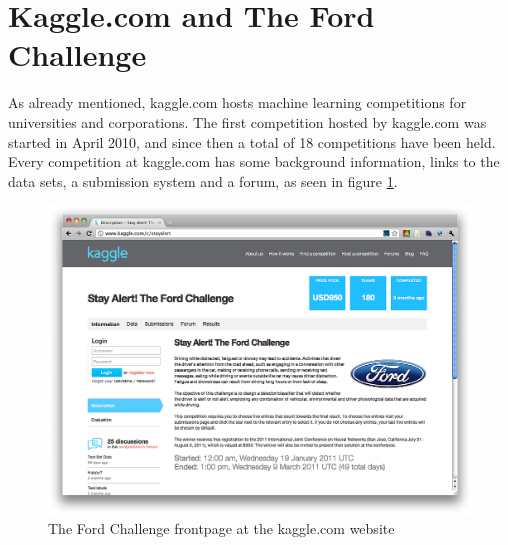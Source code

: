 \section{Kaggle.com and The Ford Challenge}
As already mentioned, kaggle.com hosts machine learning competitions for universities and corporations. The first competition hosted by kaggle.com was started in April 2010, and since then a total of 18 competitions have been held. Every competition at kaggle.com has some background information, links to the data sets, a submission system and a forum, as seen in figure \ref{fig:fordchallenge_frontpage}. \par

\begin{figure}[tbhHp]
    \centering
        \includegraphics[width=.9\textwidth]{media/fordchallenge_frontpage.png}
    \caption{The Ford Challenge frontpage at the kaggle.com website}
    \label{fig:fordchallenge_frontpage}
\end{figure}

